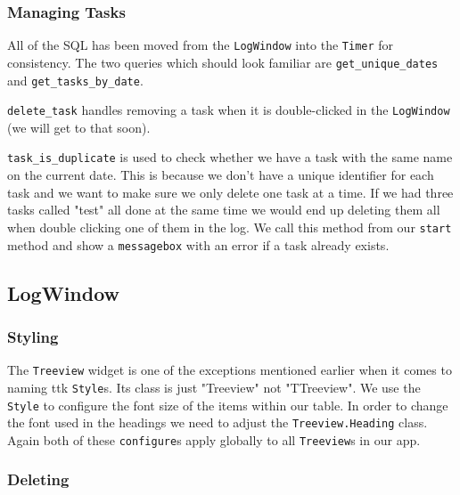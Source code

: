 \documentclass[a4paper,11pt,openany]{book}
\begin{document}
\subsubsection{Managing Tasks}

All of the SQL has been moved from the \lstinline[columns=fixed]{LogWindow} into the \lstinline[columns=fixed]{Timer} for consistency. The two queries which should look familiar are \lstinline[columns=fixed]{get_unique_dates} and \lstinline[columns=fixed]{get_tasks_by_date}. 

\vspace{5mm}

\lstinline[columns=fixed]{delete_task} handles removing a task when it is double-clicked in the \lstinline[columns=fixed]{LogWindow} (we will get to that soon). 

\vspace{5mm}

\lstinline[columns=fixed]{task_is_duplicate} is used to check whether we have a task with the same name on the current date. This is because we don't have a unique identifier for each task and we want to make sure we only delete one task at a time. If we had three tasks called "test" all done at the same time we would end up deleting them all when double clicking one of them in the log. We call this method from our \lstinline[columns=fixed]{start} method and show a \lstinline[columns=fixed]{messagebox} with an error if a task already exists.  


\subsection{LogWindow} 

\subsubsection{Styling}
The \lstinline[columns=fixed]{Treeview} widget is one of the exceptions mentioned earlier when it comes to naming ttk \lstinline[columns=fixed]{Style}s. Its class is just "Treeview" not "TTreeview". We use the \lstinline[columns=fixed]{Style} to configure the font size of the items within our table. In order to change the font used in the headings we need to adjust the \lstinline[columns=fixed]{Treeview.Heading} class. Again both of these \lstinline[columns=fixed]{configure}s apply globally to all \lstinline[columns=fixed]{Treeview}s in our app. 

\subsubsection{Deleting}
\end{document}
